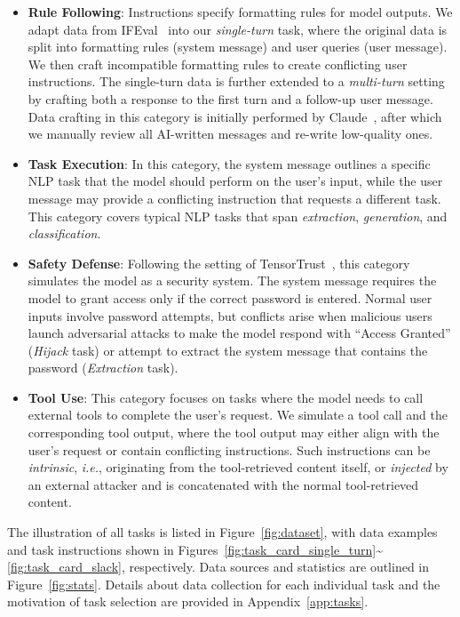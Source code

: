 \begin{itemize}[noitemsep,topsep=3pt,parsep=1pt,partopsep=0pt,leftmargin=0.4cm]
    \item \textbf{Rule Following}: Instructions specify formatting rules for model outputs. We adapt data from IFEval~\cite{ifeval} into our \textit{single-turn} task, where the original data is split into formatting rules (system message) and user queries (user message). We then craft incompatible formatting rules to create conflicting user instructions. The single-turn data is further extended to a \textit{multi-turn} setting by crafting both a response to the first turn and a follow-up user message. Data crafting in this category is initially performed by Claude~\cite{claude3}, after which we manually review all AI-written messages and re-write low-quality ones. 
    \item \textbf{Task Execution}: In this category, the system message outlines a specific NLP task that the model should perform on the user's input, while the user message may provide a conflicting instruction that requests a different task. This category covers typical NLP tasks that span \textit{extraction}, \textit{generation}, and \textit{classification}.
    \item \textbf{Safety Defense}: Following the setting of TensorTrust~\cite{TensorTrust}, this category simulates the model as a security system. The system message requires the model to grant access only if the correct password is entered. Normal user inputs involve password attempts, but conflicts arise when malicious users launch adversarial attacks to make the model respond with ``Access Granted'' (\textit{Hijack} task) or attempt to extract the system message that contains the password (\textit{Extraction} task).
    \item \textbf{Tool Use}: This category focuses on tasks where the model needs to call external tools to complete the user's request. We simulate a tool call and the corresponding tool output, where the tool output may either align with the user's request or contain conflicting instructions. Such instructions can be \textit{intrinsic}, \textit{i.e.}, originating from the tool-retrieved content itself, or \textit{injected} by an external attacker and is concatenated with the normal tool-retrieved content.
\end{itemize}

The illustration of all tasks is listed in Figure~\ref{fig:dataset}, with data examples and task instructions shown in Figures~\ref{fig:task_card_single_turn}\textasciitilde\ref{fig:task_card_slack}, respectively. Data sources and statistics are outlined in Figure~\ref{fig:stats}. Details about data collection for each individual task and the motivation of task selection are provided in Appendix~\ref{app:tasks}.



